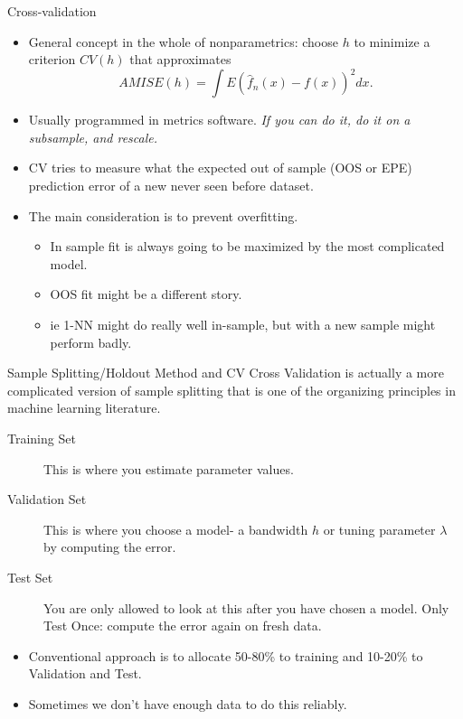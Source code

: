 \begin{frame}{Cross-validation}
  \begin{itemize}
  \item General concept in the whole of nonparametrics: choose $h$ to minimize a criterion $CV(h)$ that approximates
  $$ AMISE(h)=\int E(\hat{f}_n(x)-f(x))^2dx.$$
  \item Usually programmed in metrics software. \emph{If you can do it, do it on a subsample, and rescale.}
  \item CV tries to measure what the expected out of sample (OOS or EPE) prediction error of a new never seen before dataset.
  \item The main consideration is to prevent \alert{overfitting}.
  \begin{itemize}
  \item In sample fit is always going to be maximized by the most complicated model.
  \item OOS fit might be a different story.
  \item ie 1-NN might do really well in-sample, but with a new sample might perform badly.
  \end{itemize}
  \end{itemize}
\end{frame}
  
\begin{frame}{Sample Splitting/Holdout Method and CV}
  Cross Validation is actually a more complicated version of \alert{sample splitting} that is one of the organizing principles in machine learning literature.
  
  \begin{description}
  \item[Training Set] This is where you estimate parameter values.
  \item[Validation Set] This is where you choose a model- a bandwidth $h$ or tuning parameter $\lambda$ by computing the error.
  \item[Test Set] You are only allowed to look at this after you have chosen a model. \alert{Only Test Once}: compute the error again on fresh data.
  \end{description}
  \begin{itemize}
  \item Conventional approach is to allocate 50-80\% to training and 10-20\% to Validation and Test.
  \item Sometimes we don't have enough data to do this reliably.
  \end{itemize}
  \end{frame}
  
